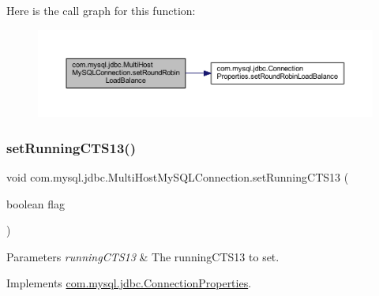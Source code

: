 Here is the call graph for this function\+:
\nopagebreak
\begin{figure}[H]
\begin{center}
\leavevmode
\includegraphics[width=350pt]{classcom_1_1mysql_1_1jdbc_1_1_multi_host_my_s_q_l_connection_abda89933ef464c432ec32e019c84d445_cgraph}
\end{center}
\end{figure}
\mbox{\label{classcom_1_1mysql_1_1jdbc_1_1_multi_host_my_s_q_l_connection_a10d268ef01a38535c6b99a9d038bb0db}} 
\subsubsection{\texorpdfstring{set\+Running\+C\+T\+S13()}{setRunningCTS13()}}
{\footnotesize\ttfamily void com.\+mysql.\+jdbc.\+Multi\+Host\+My\+S\+Q\+L\+Connection.\+set\+Running\+C\+T\+S13 (\begin{DoxyParamCaption}\item[{boolean}]{flag }\end{DoxyParamCaption})}


\begin{DoxyParams}{Parameters}
{\em running\+C\+T\+S13} & The running\+C\+T\+S13 to set. \\
\hline
\end{DoxyParams}


Implements \mbox{\hyperlink{interfacecom_1_1mysql_1_1jdbc_1_1_connection_properties_abb37aa2ea5dd29021d40a76b33b82939}{com.\+mysql.\+jdbc.\+Connection\+Properties}}.


